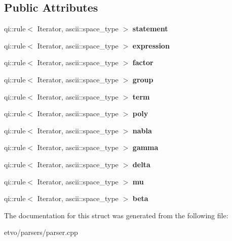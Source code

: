 \subsection*{Public Attributes}
\begin{DoxyCompactItemize}
\item 
\mbox{\label{structparseped_1_1calculator_ab46d9b24fa79188d1a922a8e9f08d792}} 
qi\+::rule$<$ Iterator, ascii\+::space\+\_\+type $>$ {\bfseries statement}
\item 
\mbox{\label{structparseped_1_1calculator_a908d152da6ba5c5029fbc3ff4828a8b9}} 
qi\+::rule$<$ Iterator, ascii\+::space\+\_\+type $>$ {\bfseries expression}
\item 
\mbox{\label{structparseped_1_1calculator_a7b00996c7b94579f09ef24b82e010a30}} 
qi\+::rule$<$ Iterator, ascii\+::space\+\_\+type $>$ {\bfseries factor}
\item 
\mbox{\label{structparseped_1_1calculator_a0bc97d6be1c040150a8dc66c5c44827a}} 
qi\+::rule$<$ Iterator, ascii\+::space\+\_\+type $>$ {\bfseries group}
\item 
\mbox{\label{structparseped_1_1calculator_a800f65823e037adb4d2acbd6ae560cd2}} 
qi\+::rule$<$ Iterator, ascii\+::space\+\_\+type $>$ {\bfseries term}
\item 
\mbox{\label{structparseped_1_1calculator_a7cf1b97fe7e3097627734c89fe1241b2}} 
qi\+::rule$<$ Iterator, ascii\+::space\+\_\+type $>$ {\bfseries poly}
\item 
\mbox{\label{structparseped_1_1calculator_aad1491bb321232952f1a99bfe0ee3fa9}} 
qi\+::rule$<$ Iterator, ascii\+::space\+\_\+type $>$ {\bfseries nabla}
\item 
\mbox{\label{structparseped_1_1calculator_a29131c7c62893a894238965347125a04}} 
qi\+::rule$<$ Iterator, ascii\+::space\+\_\+type $>$ {\bfseries gamma}
\item 
\mbox{\label{structparseped_1_1calculator_a62e78884259bdc822bf1693f7ead10c6}} 
qi\+::rule$<$ Iterator, ascii\+::space\+\_\+type $>$ {\bfseries delta}
\item 
\mbox{\label{structparseped_1_1calculator_a56e06ab194908855f63b09fc8d4eb57f}} 
qi\+::rule$<$ Iterator, ascii\+::space\+\_\+type $>$ {\bfseries mu}
\item 
\mbox{\label{structparseped_1_1calculator_a3f6b58fbe01c4f3d93a3d2e8716674be}} 
qi\+::rule$<$ Iterator, ascii\+::space\+\_\+type $>$ {\bfseries beta}
\end{DoxyCompactItemize}


The documentation for this struct was generated from the following file\+:\begin{DoxyCompactItemize}
\item 
etvo/parsers/parser.\+cpp\end{DoxyCompactItemize}
